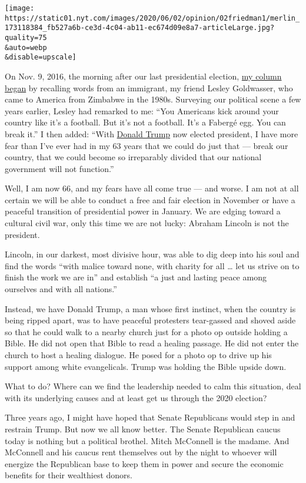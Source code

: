 \texttt{[image: https://static01.nyt.com/images/2020/06/02/opinion/02friedman1/merlin\_173118384\_fb527a6b-ce3d-4c04-ab11-ec674d09e8a7-articleLarge.jpg?quality=75\\\&auto=webp\\\&disable=upscale]}

On Nov. 9, 2016, the morning after our last presidential election,
\href{https://www.nytimes.com/2016/11/09/opinion/were-near-the-breaking-point.html}{my
column began} by recalling words from an immigrant, my friend Lesley
Goldwasser, who came to America from Zimbabwe in the 1980s. Surveying
our political scene a few years earlier, Lesley had remarked to me:
``You Americans kick around your country like it's a football. But it's
not a football. It's a Fabergé egg. You can break it.'' I then added:
``With
\href{https://www.nytimes.com/2020/06/04/world/americas/trump-george-floyd.html}{Donald
Trump} now elected president, I have more fear than I've ever had in my
63 years that we could do just that --- break our country, that we could
become so irreparably divided that our national government will not
function.''

Well, I am now 66, and my fears have all come true --- and worse. I am
not at all certain we will be able to conduct a free and fair election
in November or have a peaceful transition of presidential power in
January. We are edging toward a cultural civil war, only this time we
are not lucky: Abraham Lincoln is not the president.

Lincoln, in our darkest, most divisive hour, was able to dig deep into
his soul and find the words ``with malice toward none, with charity for
all \ldots{} let us strive on to finish the work we are in'' and
establish ``a just and lasting peace among ourselves and with all
nations.''

Instead, we have Donald Trump, a man whose first instinct, when the
country is being ripped apart, was to have peaceful protesters
tear-gassed and shoved aside so that he could walk to a nearby church
just for a photo op outside holding a Bible. He did not open that Bible
to read a healing passage. He did not enter the church to host a healing
dialogue. He posed for a photo op to drive up his support among white
evangelicals. Trump was holding the Bible upside down.

What to do? Where can we find the leadership needed to calm this
situation, deal with its underlying causes and at least get us through
the 2020 election?

Three years ago, I might have hoped that Senate Republicans would step
in and restrain Trump. But now we all know better. The Senate Republican
caucus today is nothing but a political brothel. Mitch McConnell is the
madame. And McConnell and his caucus rent themselves out by the night to
whoever will energize the Republican base to keep them in power and
secure the economic benefits for their wealthiest donors.

